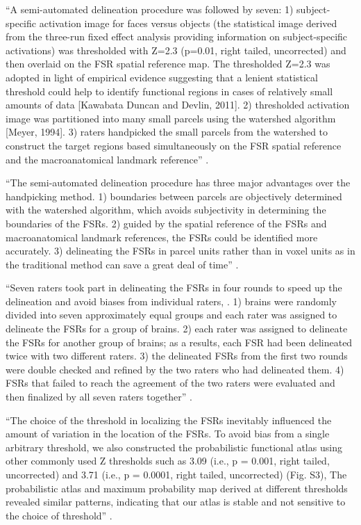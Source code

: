 ``A semi-automated delineation procedure was followed by seven:
%
1) subject-specific activation image for faces versus objects (the statistical
image derived from the three-run fixed effect analysis providing information on
subject-specific activations) was thresholded with Z=2.3 (p=0.01, right tailed,
uncorrected) and then overlaid on the FSR spatial reference map.
%
The thresholded Z=2.3 was adopted in light of empirical evidence suggesting
that a lenient statistical threshold could help to identify functional regions
in cases of relatively small amounts of data [Kawabata Duncan and Devlin, 2011].
%
2) thresholded activation image was partitioned into many small parcels using
the watershed algorithm [Meyer, 1994].
%
3) raters handpicked the small parcels from the watershed to construct the
target regions based simultaneously on the FSR spatial reference and the
macroanatomical landmark reference'' \citet{zhen2015quantifying}.

``The semi-automated delineation procedure has three major advantages over the
handpicking method.
%
1) boundaries between parcels are objectively determined with the watershed
algorithm, which avoids subjectivity in determining the boundaries of the FSRs.
%
2) guided by the spatial reference of the FSRs and macroanatomical landmark
references, the FSRs could be identified more accurately.
%
3) delineating the FSRs in parcel units rather than in voxel units as in the
traditional method can save a great deal of time'' \citet{zhen2015quantifying}.

``Seven raters took part in delineating the FSRs in four rounds to speed up the
delineation and avoid biases from individual raters, .
%
1) brains were randomly divided into seven approximately equal groups and each
rater was assigned to delineate the FSRs for a group of brains.
%
2) each rater was assigned to delineate the FSRs for another group of brains;
%
as a results, each FSR had been delineated twice with two different raters.
%
3) the delineated FSRs from the first two rounds were double checked and refined
by the two raters who had delineated them.
%
4) FSRs that failed to reach the agreement of the two raters were evaluated and
then finalized by all seven raters together'' \citet{zhen2015quantifying}.

``The choice of the threshold in localizing the FSRs inevitably influenced the
amount of variation in the location of the FSRs.
%
To avoid bias from a single arbitrary threshold, we also constructed the
probabilistic functional atlas using other commonly used Z thresholds such as
3.09 (i.e., p = 0.001, right tailed, uncorrected) and 3.71 (i.e., p = 0.0001,
right tailed, uncorrected) (Fig. S3),
%
The probabilistic atlas and maximum probability map derived at different
thresholds revealed similar patterns, indicating that our atlas is stable and
not sensitive to the choice of threshold'' \citep{zhen2015quantifying}.

